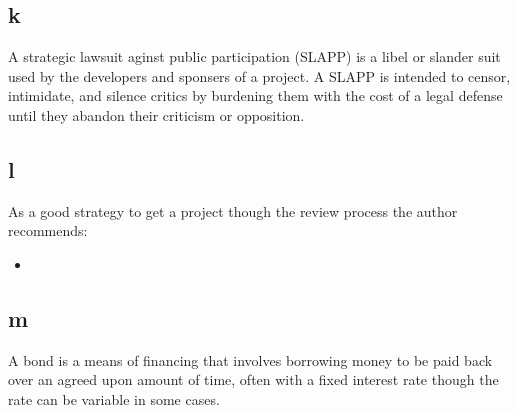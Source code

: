 \documentclass[12pt]{article} %
\begin{document}
	\subsection{k}
		A strategic lawsuit aginst public participation (SLAPP) is a libel or slander suit used by the developers and sponsers of a project. A SLAPP is intended to censor, intimidate, and silence critics by burdening them with the cost of a legal defense until they abandon their criticism or opposition.
		
	\subsection{l}
		As a good strategy to get a project though the review process the author recommends:
		\begin{itemize}
			\item
		\end{itemize}
	
	\subsection{m}
		A bond is a means of financing that involves borrowing money to be paid back over an agreed upon amount of time, often with a fixed interest rate though the rate can be variable in some cases.
	
\end{document}
